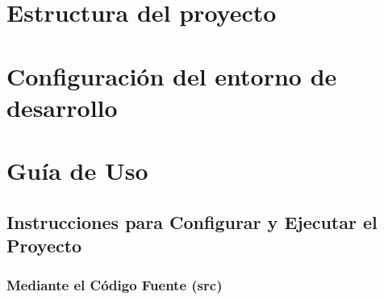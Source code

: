 \documentclass{article}
\begin{document}
\section{Estructura del proyecto}

\section{Configuración del entorno de desarrollo}

\section{Guía de Uso}
    \subsection{Instrucciones para Configurar y Ejecutar el Proyecto}

    \subsubsection{Mediante el Código Fuente (src)}
\end{document}
